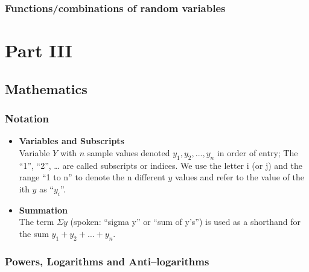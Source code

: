 \documentclass[]{book}
\begin{document}
\hypertarget{functionscombinations-of-random-variables}{%
\section{Functions/combinations of random variables}\label{functionscombinations-of-random-variables}}

\hypertarget{part-part-iii}{%
\part{Part III}\label{part-part-iii}}

\hypertarget{math}{%
\chapter{Mathematics}\label{math}}

\hypertarget{notation}{%
\section{Notation}\label{notation}}

\begin{itemize}
\item
  \textbf{Variables and Subscripts}\\
  Variable \(Y\) with \(n\) sample values denoted \(y_1, y_2, ..., y_n\) in order of entry; The ``1'', ``2'', \ldots{} are called subscripts or indices. We use the letter i (or j) and the range ``1 to n'' to denote the n different \(y\) values and refer to the value of the ith \(y\) as ``\(y_i\)''.
\item
  \textbf{Summation}\\
  The term \(\Sigma y\) (spoken: ``sigma y'' or ``sum of y's'') is used as a shorthand for the sum \(y_1 + y_2 + \dots + y_n\).
\end{itemize}

\hypertarget{powers-logarithms-and-antilogarithms}{%
\section{Powers, Logarithms and Anti--logarithms}\label{powers-logarithms-and-antilogarithms}}
\end{document}
